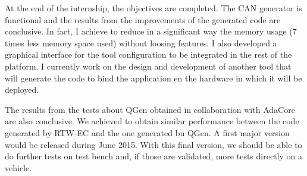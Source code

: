 At the end of the internship, the objectives are completed. The CAN generator is
functional and the results from the improvements of the generated code are
conclusive. In fact, I achieve to reduce in a significant way the memory usage
(7 times less memory space used) without loosing features. I also developed a
graphical interface for the tool configuration to be integrated in the rest of
the platform. I currently work on the design and development of another tool
that will generate the code to bind the application en the hardware in which it
will be deployed.

The results from the tests about QGen obtained in collaboration with AdaCore are
also conclusive. We achieved to obtain similar performance between the code
generated by RTW-EC\up{\circledR} and the one generated bu QGen. A first major
version would be released during June 2015. With this final version, we should
be able to do further tests on test bench and, if those are validated, more
tests directly on a vehicle.


